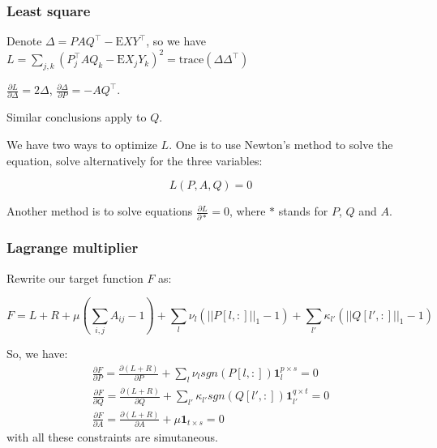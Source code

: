 \documentclass{beamer}
\begin{document}
\begin{frame}
\frametitle{Least square}

Denote $\Delta = PAQ^\top - \text{E}XY^\top$, so we have $L = \sum_{j,k}(P_j^\top A Q_k - \text{E}X_j Y_k)^2 = \text{trace}({\Delta \Delta^\top})$

$\frac{\partial L}{\partial \Delta} = 2\Delta$, $\frac{\partial \Delta}{\partial P} = -AQ^\top$.

Similar conclusions apply to $Q$.

We have two ways to optimize $L$. One is to use Newton's method to solve the equation, solve alternatively for the three variables:

\begin{equation}
L(P, A, Q) = 0
\end{equation}

Another method is to solve equations $\frac{\partial L}{\partial \ast} = 0$, where $\ast$ stands for $P$, $Q$ and $A$.
\end{frame}

\begin{frame}
\frametitle{Lagrange multiplier}

Rewrite our target function $F$ as:

\begin{equation}
F = L + R + \mu (\sum_{i,j} A_{ij} - 1) + \sum_l {\nu_l (||P[l, :]||_1 - 1)} + \sum_{l'}{\kappa_{l'} (||Q[l', :]||_1 - 1)}
\end{equation}

So, we have:
\begin{eqnarray}
\frac{\partial F}{\partial P} = \frac{\partial (L + R)}{\partial P} + \sum_l{\nu_l sgn(P[l, :]) \textbf{1}^{p \times s}_l} = 0 \\
\frac{\partial F}{\partial Q} = \frac{\partial (L + R)}{\partial Q} + \sum_{l'}{\kappa_{l'} sgn(Q[l', :]) \textbf{1}^{q \times t}_{l'}} = 0 \\
\frac{\partial F}{\partial A} = \frac{\partial (L + R)}{\partial A} + \mu \textbf{1}_{t \times s} = 0
\end{eqnarray}
with all these constraints are simutaneous.

\end{frame}
\end{document}
